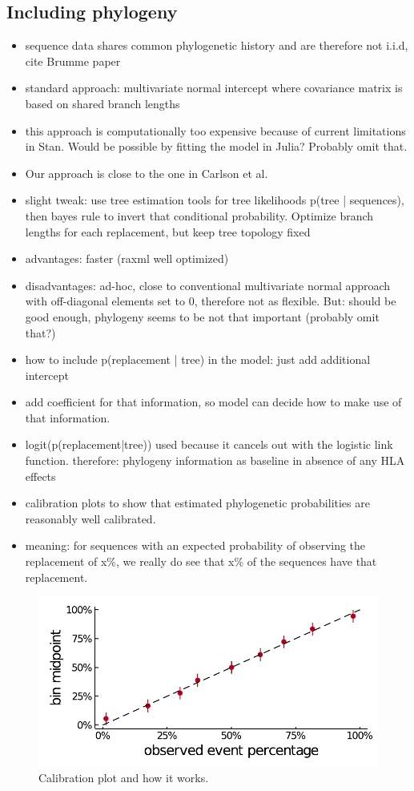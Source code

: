 \documentclass[fleqn,11pt]{SelfArx} %
\begin{document}
\subsection*{Including phylogeny}
\begin{itemize}
  \item sequence data shares common phylogenetic history and are therefore not i.i.d,
    cite Brumme paper
  \item standard approach: multivariate normal intercept where covariance matrix is based on 
    shared branch lengths
  \item this approach is computationally too expensive because of current limitations in 
    Stan. Would be possible by fitting the model in Julia? Probably omit that.
  \item Our approach is close to the one in Carlson et al.
  \item slight tweak: use tree estimation tools for tree likelihoods p(tree | sequences),
    then bayes rule to invert that conditional probability. Optimize branch lengths
    for each replacement, but keep tree topology fixed
  \item advantages: faster (raxml well optimized)
  \item disadvantages: ad-hoc, close to conventional multivariate normal approach with 
    off-diagonal elements set to 0, therefore not as flexible. But: should be good enough,
    phylogeny seems to be not that important (probably omit that?)
  \item how to include p(replacement | tree) in the model: just add additional intercept
  \item add coefficient for that information, so model can decide how to make use of
    that information.
  \item logit(p(replacement|tree)) used because it cancels out with the logistic
    link function. therefore: phylogeny information as baseline in absence of any 
    HLA effects
  \item calibration plots to show that estimated phylogenetic probabilities are
   reasonably well calibrated.
  \item meaning: for sequences with an expected probability of observing the replacement
    of x\%, we really do see that x\% of the sequences have that replacement.
\end{itemize}

\begin{figure}[!ht]
  \includegraphics[width=1\linewidth]{plots/phylogeny_calibration.pdf}
  \caption{Calibration plot and how it works.}
\end{figure}
\end{document}
